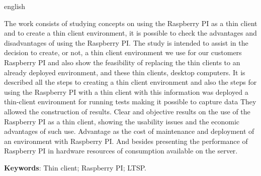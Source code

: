 \documentclass[
	12pt,				%
	openright,			%
	twoside,			%
	a4paper,			%
	chapter=TITLE,		%
	english,			%
	brazil				%
	]{abntex2}
\begin{document}
\begin{resumo}[Abstract]
 \begin{otherlanguage*}{english}
   
   The work consists of studying concepts on using the Raspberry PI as a thin client and to create a thin client environment, it is possible to check the advantages and disadvantages of using the Raspberry PI. The study is intended to assist in the decision to create, or not, a thin client environment we use for our customers Raspberry PI and also show the feasibility of replacing the thin clients to an already deployed environment, and these thin clients, desktop computers. It is described all the steps to creating a thin client environment and also the steps for using the Raspberry PI with a thin client with this information was deployed a thin-client environment for running tests making it possible to capture data They allowed the construction of results. Clear and objective results on the use of the Raspberry PI as a thin client, showing the usability issues and the economic advantages of such use. Advantage as the cost of maintenance and deployment of an environment with Raspberry PI. And besides presenting the performance of Raspberry PI in hardware resources of consumption available on the server.

   \vspace{\onelineskip}
 
   \noindent 
   \textbf{Keywords}: Thin client; Raspberry PI; LTSP.
 \end{otherlanguage*}
\end{resumo}





\tableofcontents*
\cleardoublepage

\end{document}
